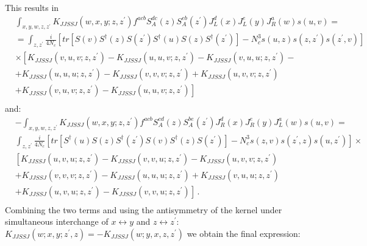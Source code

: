 \documentclass[11pt,a4paper]{article}
\begin{document}
This results in
 \begin{equation}\begin{split}
&\int_{x,y,w,z,z^{\prime}}K_{JJSSJ}(w,x,y;z,z^{\prime})f^{acb}S_A^{dc}(z)S_A^{eb}(z^{\prime})J_{L}^{d}(x)J_{L}^{e}(y)J_{R}^{a}(w)s(u,v)=\\
&=\int_{z,z^{\prime}}\frac{i}{4N_{c}}\left[tr\left[S(v)S^{\dagger}(z)S(z^{\prime})S^{\dagger}(u)S(z)S^{\dagger}(z^{\prime})\right]-N_{c}^{3}s(u,z)s(z,z^{\prime})s(z^{\prime},v)\right]\\
&\times \left[K_{JJSSJ}(v,u,v;z,z^{\prime})-K_{JJSSJ}(u,u,v;z,z^{\prime})-K_{JJSSJ}(v,u,u;z,z^{\prime})-\right.\\ 
& +K_{JJSSJ}(u,u,u;z,z^{\prime}) -K_{JJSSJ}(v,v,v;z,z^{\prime})+K_{JJSSJ}(u,v,v;z,z^{\prime})\\
&\left.+K_{JJSSJ}(v,u,v;z,z^{\prime})-K_{JJSSJ}(u,u,v;z,z^{\prime})\right]\\
  \end{split}\end{equation}
and:
   \begin{equation}\begin{split}
&-\int_{x,y,w,z,z^{\prime}}K_{JJSSJ}(w,x,y;z,z^{\prime})f^{acb}S_A^{cd}(z)S_A^{be}(z^{\prime})J_{R}^{d}(x)J_{R}^{e}(y)J_{L}^{a}(w)s(u,v)=\\
&\int_{z,z^{\prime}}\frac{i}{4N_{c}}\left[tr\left[S^{\dagger}(u)S(z)S^{\dagger}(z^{\prime})S(v)S^{\dagger}(z)S(z^{\prime})\right]-N_{c}^{3}s(z,v)s(z^{\prime},z)s(u,z^{\prime})\right]\times\\
&\left[K_{JJSSJ}(u,v,u;z,z^{\prime})-K_{JJSSJ}(v,v,u;z,z^{\prime})-K_{JJSSJ}(u,v,v;z,z^{\prime})\right.\\
&+K_{JJSSJ}(v,v,v;z,z^{\prime})-K_{JJSSJ}(u,u,u;z,z^{\prime})+K_{JJSSJ}(v,u,u;z,z^{\prime})\\
&\left. +K_{JJSSJ}(u,v,u;z,z^{\prime})-K_{JJSSJ}(v,v,u;z,z^{\prime})\right]\,.\\
     \end{split}\end{equation}
Combining the two terms and using the antisymmetry of the kernel under 
simultaneous interchange of $x\leftrightarrow y$ and $z\leftrightarrow  z^\prime$:  $K_{JJSSJ}(w;x,y;z^{\prime},z)=-K_{JJSSJ}(w;y,x,z,z^{\prime})$
we obtain the final expression:
\end{document}
